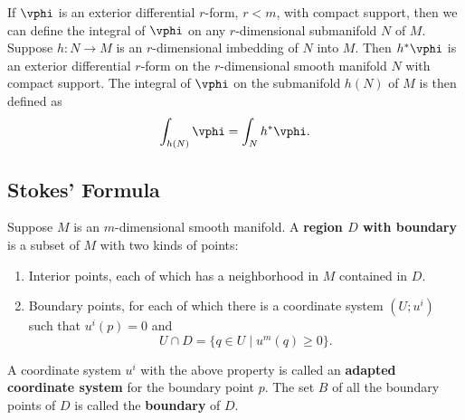 \documentclass[11pt]{article}
\begin{document}
If $\vphi$ is an exterior differential $r$-form, $r < m$, with compact support, then we can define the integral of $\vphi$ on any $r$-dimensional submanifold $N$ of $M$. Suppose $h : N \rightarrow M$ is an $r$-dimensional imbedding of $N$ into $M$. Then $h^*\vphi$ is an exterior differential $r$-form on the $r$-dimensional smooth manifold $N$ with compact support. The integral of $\vphi$ on the submanifold $h(N)$ of $M$ is then defined as $$\int_{h(N)} \vphi = \int_N h^*\vphi.$$

\subsection{Stokes' Formula}

\begin{definition}
    Suppose $M$ is an $m$-dimensional smooth manifold. A \textbf{region $D$ with boundary} is a subset of $M$ with two kinds of points:
    \begin{enumerate}
        \item Interior points, each of which has a neighborhood in $M$ contained in $D$.
        \item Boundary points, for each of which there is a coordinate system $(U; u^i)$ such that $u^i(p) = 0$ and $$U \cap D = \{q \in U \mid u^m(q) \ge 0\}.$$
    \end{enumerate}
    A coordinate system $u^i$ with the above property is called an \textbf{adapted coordinate system} for the boundary point $p$. The set $B$ of all the boundary points of $D$ is called the \textbf{boundary} of $D$. 
\end{definition}
\end{document}
